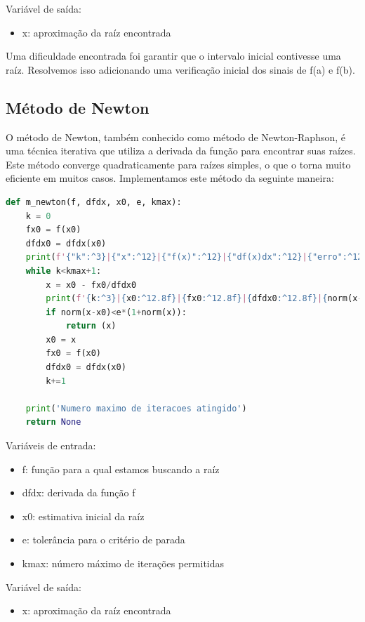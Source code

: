 \documentclass{article}
\begin{document}
Vari\'{a}vel de sa\'{i}da:
\begin{itemize}
    \item x: aproxima\c{c}\~{a}o da ra\'{i}z encontrada
\end{itemize}

Uma dificuldade encontrada foi garantir que o intervalo inicial contivesse uma ra\'{i}z. Resolvemos isso adicionando uma verifica\c{c}\~{a}o inicial dos sinais de f(a) e f(b).



\subsection{M\'{e}todo de Newton}
O m\'{e}todo de Newton, tamb\'{e}m conhecido como m\'{e}todo de Newton-Raphson, \'{e} uma t\'{e}cnica iterativa que utiliza a derivada da fun\c{c}\~{a}o para encontrar suas ra\'{i}zes. Este m\'{e}todo converge quadraticamente para ra\'{i}zes simples, o que o torna muito eficiente em muitos casos. Implementamos este m\'{e}todo da seguinte maneira:

\begin{lstlisting}[language=Python]
def m_newton(f, dfdx, x0, e, kmax):
    k = 0
    fx0 = f(x0)
    dfdx0 = dfdx(x0)
    print(f'{"k":^3}|{"x":^12}|{"f(x)":^12}|{"df(x)dx":^12}|{"erro":^12}')
    while k<kmax+1:
        x = x0 - fx0/dfdx0
        print(f'{k:^3}|{x0:^12.8f}|{fx0:^12.8f}|{dfdx0:^12.8f}|{norm(x-x0):^12.8f}')  # Corpo da tabela
        if norm(x-x0)<e*(1+norm(x)):
            return (x)
        x0 = x
        fx0 = f(x0)
        dfdx0 = dfdx(x0)
        k+=1
        
    print('Numero maximo de iteracoes atingido')
    return None
\end{lstlisting}

Vari\'{a}veis de entrada:
\begin{itemize}
    \item f: fun\c{c}\~{a}o para a qual estamos buscando a ra\'{i}z
    \item dfdx: derivada da fun\c{c}\~{a}o f
    \item x0: estimativa inicial da ra\'{i}z
    \item e: toler\^{a}ncia para o crit\'{e}rio de parada
    \item kmax: n\'{u}mero m\'{a}ximo de itera\c{c}\~{o}es permitidas
\end{itemize}

Vari\'{a}vel de sa\'{i}da:
\begin{itemize}
    \item x: aproxima\c{c}\~{a}o da ra\'{i}z encontrada
\end{itemize}
\end{document}
